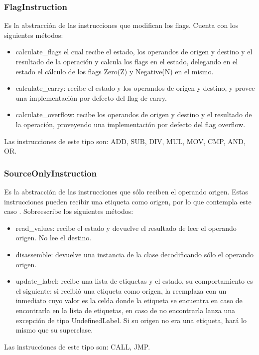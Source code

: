 \subsubsection{FlagInstruction}
Es la abstracción de las instrucciones que modifican los flags. Cuenta con los siguientes métodos:

\begin{itemize}
\item calculate\_flags el cual recibe el estado, los operandos de origen y destino y el resultado de la operación y calcula los flags en el estado, delegando en el estado el cálculo de los flags Zero(Z) y Negative(N) en el mismo. 
\item calculate\_carry: recibe el estado y los operandos de origen y destino, y provee una implementación por defecto del flag de carry.	
\item calculate\_overflow: recibe los operandos de origen y destino y el resultado de la operación, proveyendo una implementación por defecto del flag overflow.
\end{itemize}

Las instrucciones de este tipo son: ADD, SUB, DIV, MUL, MOV, CMP, AND, OR.


\subsubsection{SourceOnlyInstruction}
Es la abstracción de las instrucciones que sólo reciben el operando origen. Estas instrucciones pueden recibir una etiqueta como origen, por lo que contempla este caso .
Sobreescribe los siguientes métodos:
\begin{itemize}
\item read\_values: recibe el estado y devuelve el resultado de leer el operando origen. No lee el destino.
\item disassemble: devuelve una instancia de la clase decodificando sólo el operando origen.
\item update\_label: recibe una lista de etiquetas y el estado, su comportamiento es el siguiente: si recibió una etiqueta como origen, la reemplaza con un inmediato cuyo valor es la celda donde la etiqueta se encuentra en caso de encontrarla en la lista de etiquetas, en caso de no encontrarla lanza una excepción de tipo UndefinedLabel. Si su origen no era una etiqueta, hará lo mismo que su superclase.
\end{itemize}

Las instrucciones de este tipo son: CALL, JMP.

